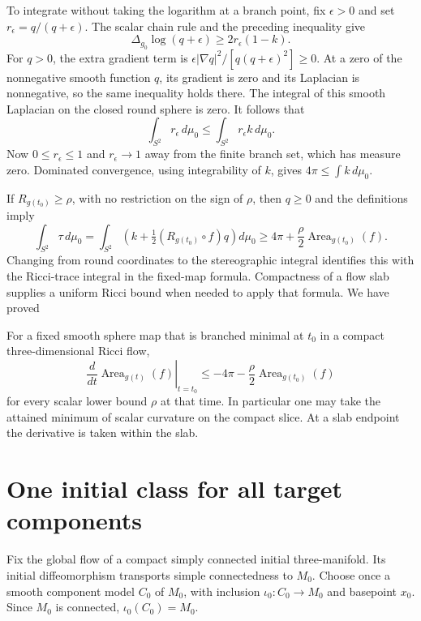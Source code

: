To integrate without taking the logarithm at a branch point, fix
$\epsilon>0$ and set $r_\epsilon=q/(q+\epsilon)$. The scalar chain rule
and the preceding inequality give
\[
 \Delta_{g_0}\log(q+\epsilon)
 \geq 2r_\epsilon(1-k).
\]
For $q>0$, the extra gradient term is
$\epsilon|\nabla q|^2/[q(q+\epsilon)^2]\geq0$.
At a zero of the nonnegative smooth function $q$, its gradient is zero
and its Laplacian is nonnegative, so the same inequality holds there.
The integral of this smooth Laplacian on the closed round sphere is
zero. It follows that
\[
 \int_{S^2}r_\epsilon\,d\mu_0
 \leq\int_{S^2}r_\epsilon k\,d\mu_0.
\]
Now $0\leq r_\epsilon\leq1$ and $r_\epsilon\to1$ away from the
finite branch set, which has measure zero. Dominated convergence, using
integrability of $k$, gives $4\pi\leq\int k\,d\mu_0$.

If $R_{g(t_0)}\geq\rho$, with no restriction on the sign of $\rho$,
then $q\geq0$ and the definitions imply
\[
 \int_{S^2}\tau\,d\mu_0
 =\int_{S^2}\left(k+\tfrac12(R_{g(t_0)}\circ f)q\right)d\mu_0
 \geq4\pi+\frac\rho2\operatorname{Area}_{g(t_0)}(f).
\]
Changing from round coordinates to the stereographic integral identifies
this with the Ricci-trace integral in the fixed-map formula. Compactness
of a flow slab supplies a uniform Ricci bound when needed to apply that
formula. We have proved
\begin{proposition}
\label{prop:filling-minimal-sphere-variation}
For a fixed smooth sphere map that is branched minimal at $t_0$ in a
compact three-dimensional Ricci flow,
\[
 \left.\frac{d}{dt}\operatorname{Area}_{g(t)}(f)\right|_{t=t_0}
 \leq-4\pi-\frac\rho2\operatorname{Area}_{g(t_0)}(f)
\]
for every scalar lower bound $\rho$ at that time. In particular one may
take the attained minimum of scalar curvature on the compact slice.
At a slab endpoint the derivative is taken within the slab.
\end{proposition}

\section{One initial class for all target components}
\label{sec:filling-fixed-initial-class}

Fix the global flow of a compact simply connected initial three-manifold.
Its initial diffeomorphism transports simple connectedness to $M_0$.
Choose once a smooth component model $C_0$ of $M_0$, with inclusion
$\iota_0:C_0\to M_0$ and basepoint $x_0$.  Since $M_0$ is connected,
$\iota_0(C_0)=M_0$.

